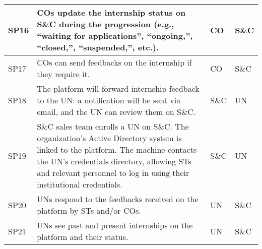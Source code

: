 \begin{longtable}{|l|p{}|l|l|}
    \hline
    SP16               & COs update the internship status on S\&C during the progression (e.g., “waiting for applications”, “ongoing,”, “closed,”, “suspended,”, etc.).                                                                                                        & CO         & S\&C     \\
    \hline
    SP17               & COs can send feedbacks on the internship if they require it.                                                                                                                                                                                          & CO         & S\&C     \\
    \hline
    SP18               & The platform will forward internship feedback to the UN: a notification will be sent via email, and the UN can review them on S\&C.                                                                                                                   & S\&C       & UN       \\
    \hline
    SP19               & S\&C sales team enrolls a UN on S\&C. The organization's Active Directory system is linked to the platform. The machine contacts the UN's credentials directory, allowing STs and relevant personnel to log in using their institutional credentials. & S\&C       & UN       \\
    \hline
    SP20               & UNs respond to the feedbacks received on the platform by STs and/or COs.                                                                                                                                                                              & UN         & S\&C     \\
    \hline
    SP21               & UNs see past and present internships on the platform and their status.                                                                                                                                                                                & UN         & S\&C     \\
    \hline
\end{longtable}
